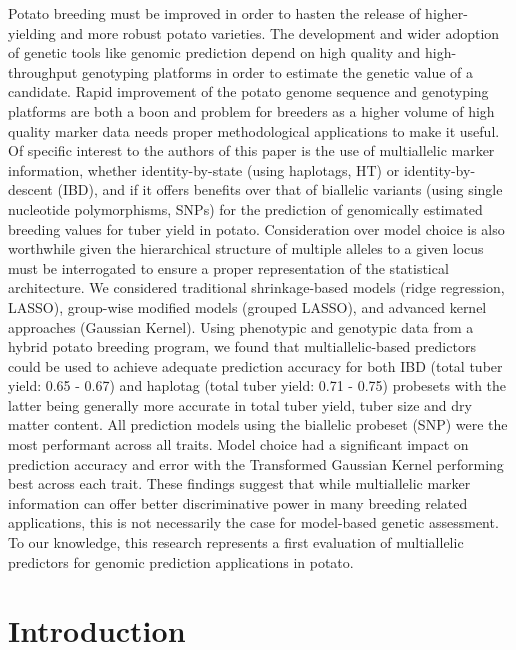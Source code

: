 \begin{refsection}
Potato breeding must be improved in order to hasten the release of
higher-yielding and more robust potato varieties. The
development and wider adoption of genetic tools like genomic prediction
depend on high quality and high-throughput genotyping platforms in order
to estimate the genetic value of a candidate. Rapid improvement of the
potato genome sequence and genotyping platforms are both a boon and
problem for breeders as a higher volume of high quality marker data
needs proper methodological applications to make it useful. Of specific
interest to the authors of this paper is the use of multiallelic
marker information, whether identity-by-state (using haplotags, HT) or
identity-by-descent (IBD), and if it offers benefits over that of
biallelic variants (using single nucleotide polymorphisms, SNPs) for the
prediction of genomically estimated breeding values for tuber yield in
potato. Consideration over model choice is also worthwhile given the
hierarchical structure of multiple alleles to a given locus must be
interrogated to ensure a proper representation of the statistical
architecture. We considered traditional shrinkage-based models (ridge
regression, LASSO), group-wise modified models (grouped LASSO), and
advanced kernel approaches (Gaussian Kernel). Using phenotypic and
genotypic data from a hybrid potato breeding program, we found that
multiallelic-based predictors could be used to achieve adequate prediction
accuracy for both IBD (total tuber yield: 0.65 - 0.67) and haplotag
(total tuber yield: 0.71 - 0.75) probesets with the latter being
generally more accurate in total tuber yield, tuber size and dry matter
content. All prediction models using the biallelic probeset (SNP) were
the most performant across all traits. Model choice had a
significant impact on prediction accuracy and error with the Transformed
Gaussian Kernel performing best across each trait. These findings
suggest that while multiallelic marker information can offer better
discriminative power in many breeding related applications, this is
not necessarily the case for model-based genetic assessment. To our knowledge, this research represents a first evaluation of multiallelic predictors for genomic prediction applications in
potato.

\section{Introduction}\label{introduction}


\end{refsection}
